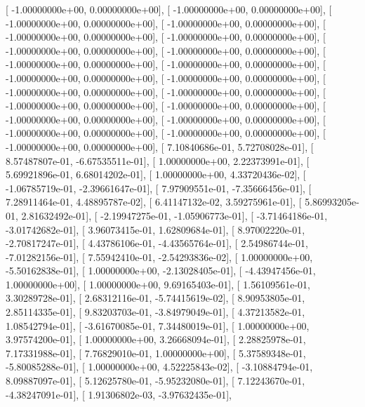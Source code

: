 \documentclass{article}
\begin{document}
       [ -1.00000000e+00,   0.00000000e+00],
       [ -1.00000000e+00,   0.00000000e+00],
       [ -1.00000000e+00,   0.00000000e+00],
       [ -1.00000000e+00,   0.00000000e+00],
       [ -1.00000000e+00,   0.00000000e+00],
       [ -1.00000000e+00,   0.00000000e+00],
       [ -1.00000000e+00,   0.00000000e+00],
       [ -1.00000000e+00,   0.00000000e+00],
       [ -1.00000000e+00,   0.00000000e+00],
       [ -1.00000000e+00,   0.00000000e+00],
       [ -1.00000000e+00,   0.00000000e+00],
       [ -1.00000000e+00,   0.00000000e+00],
       [ -1.00000000e+00,   0.00000000e+00],
       [ -1.00000000e+00,   0.00000000e+00],
       [ -1.00000000e+00,   0.00000000e+00],
       [ -1.00000000e+00,   0.00000000e+00],
       [ -1.00000000e+00,   0.00000000e+00],
       [ -1.00000000e+00,   0.00000000e+00],
       [ -1.00000000e+00,   0.00000000e+00],
       [ -1.00000000e+00,   0.00000000e+00],
       [ -1.00000000e+00,   0.00000000e+00],
       [  7.10840686e-01,   5.72708028e-01],
       [  8.57487807e-01,  -6.67535511e-01],
       [  1.00000000e+00,   2.22373991e-01],
       [  5.69921896e-01,   6.68014202e-01],
       [  1.00000000e+00,   4.33720436e-02],
       [ -1.06785719e-01,  -2.39661647e-01],
       [  7.97909551e-01,  -7.35666456e-01],
       [  7.28911464e-01,   4.48895787e-02],
       [  6.41147132e-02,   3.59275961e-01],
       [  5.86993205e-01,   2.81632492e-01],
       [ -2.19947275e-01,  -1.05906773e-01],
       [ -3.71464186e-01,  -3.01742682e-01],
       [  3.96073415e-01,   1.62809684e-01],
       [  8.97002220e-01,  -2.70817247e-01],
       [  4.43786106e-01,  -4.43565764e-01],
       [  2.54986744e-01,  -7.01282156e-01],
       [  7.55942410e-01,  -2.54293836e-02],
       [  1.00000000e+00,  -5.50162838e-01],
       [  1.00000000e+00,  -2.13028405e-01],
       [ -4.43947456e-01,   1.00000000e+00],
       [  1.00000000e+00,   9.69165403e-01],
       [  1.56109561e-01,   3.30289728e-01],
       [  2.68312116e-01,  -5.74415619e-02],
       [  8.90953805e-01,   2.85114335e-01],
       [  9.83203703e-01,  -3.84979049e-01],
       [  4.37213582e-01,   1.08542794e-01],
       [ -3.61670085e-01,   7.34480019e-01],
       [  1.00000000e+00,   3.97574200e-01],
       [  1.00000000e+00,   3.26668094e-01],
       [  2.28825978e-01,   7.17331988e-01],
       [  7.76829010e-01,   1.00000000e+00],
       [  5.37589348e-01,  -5.80085288e-01],
       [  1.00000000e+00,   4.52225843e-02],
       [ -3.10884794e-01,   8.09887097e-01],
       [  5.12625780e-01,  -5.95232080e-01],
       [  7.12243670e-01,  -4.38247091e-01],
       [  1.91306802e-03,  -3.97632435e-01],
\end{document}

